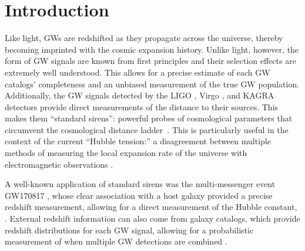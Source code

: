 \documentclass[]{aastex631}
\begin{document}
\section{Introduction}
\label{sec:intro}
Like light, \acp{GW} are redshifted as they propagate across the universe, thereby becoming imprinted with the cosmic expansion history.
Unlike light, however, the form of \ac{GW} signals are known from first principles and their selection effects are extremely well understood.
This allows for a precise estimate of each \ac{GW} catalogs' completeness and an unbiased measurement of the true \ac{GW} population. 
Additionally, the \ac{GW} signals detected by the LIGO \citep{aasi_advanced_2015}, Virgo \citep{acernese_advanced_2014}, and KAGRA \citep{akutsu_overview_2021} detectors provide direct measurements of the distance to their sources.
This makes them ``standard sirens'': powerful probes of cosmological parameters that circumvent the cosmological distance ladder~\citep{schutz_determining_1986,holz_using_2005}. 
This is particularly useful in the context of the current ``Hubble tension:'' a disagreement between multiple methods of measuring the local expansion rate of the universe with electromagnetic observations \citep{freedman_measurements_2021}.

A well-known application of standard sirens was the multi-messenger event GW170817 \citep{abbott_multi-messenger_2017}, whose clear association with a host galaxy provided a precise redshift measurement, allowing for a direct measurement of the Hubble constant, \Ho{} \citep{ abbott_gravitational-wave_2017}.
External redshift information can also come from galaxy catalogs, which provide redshift distributions for each \ac{GW} signal, allowing for a probabilistic measurement of \Ho{} when multiple \ac{GW} detections are combined \citep[e.g.][]{del_pozzo_inference_2012, chen_two_2018, fishbach_standard_2019, gray_cosmological_2020, gwtc3_cosmo, gair_hitchhikers_2023}.
\end{document}
